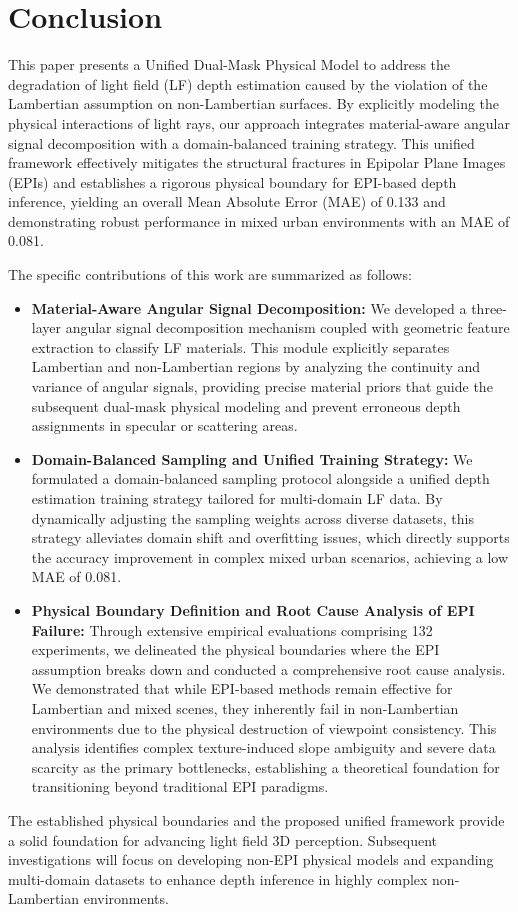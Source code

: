 \section{Conclusion}


This paper presents a Unified Dual-Mask Physical Model to address the degradation of light field (LF) depth estimation caused by the violation of the Lambertian assumption on non-Lambertian surfaces. By explicitly modeling the physical interactions of light rays, our approach integrates material-aware angular signal decomposition with a domain-balanced training strategy. This unified framework effectively mitigates the structural fractures in Epipolar Plane Images (EPIs) and establishes a rigorous physical boundary for EPI-based depth inference, yielding an overall Mean Absolute Error (MAE) of 0.133 and demonstrating robust performance in mixed urban environments with an MAE of 0.081.

The specific contributions of this work are summarized as follows:

\begin{itemize}
 \item \textbf{Material-Aware Angular Signal Decomposition:} We developed a three-layer angular signal decomposition mechanism coupled with geometric feature extraction to classify LF materials. This module explicitly separates Lambertian and non-Lambertian regions by analyzing the continuity and variance of angular signals, providing precise material priors that guide the subsequent dual-mask physical modeling and prevent erroneous depth assignments in specular or scattering areas.
 \item \textbf{Domain-Balanced Sampling and Unified Training Strategy:} We formulated a domain-balanced sampling protocol alongside a unified depth estimation training strategy tailored for multi-domain LF data. By dynamically adjusting the sampling weights across diverse datasets, this strategy alleviates domain shift and overfitting issues, which directly supports the accuracy improvement in complex mixed urban scenarios, achieving a low MAE of 0.081.
 \item \textbf{Physical Boundary Definition and Root Cause Analysis of EPI Failure:} Through extensive empirical evaluations comprising 132 experiments, we delineated the physical boundaries where the EPI assumption breaks down and conducted a comprehensive root cause analysis. We demonstrated that while EPI-based methods remain effective for Lambertian and mixed scenes, they inherently fail in non-Lambertian environments due to the physical destruction of viewpoint consistency. This analysis identifies complex texture-induced slope ambiguity and severe data scarcity as the primary bottlenecks, establishing a theoretical foundation for transitioning beyond traditional EPI paradigms.
\end{itemize}
The established physical boundaries and the proposed unified framework provide a solid foundation for advancing light field 3D perception. Subsequent investigations will focus on developing non-EPI physical models and expanding multi-domain datasets to enhance depth inference in highly complex non-Lambertian environments.


